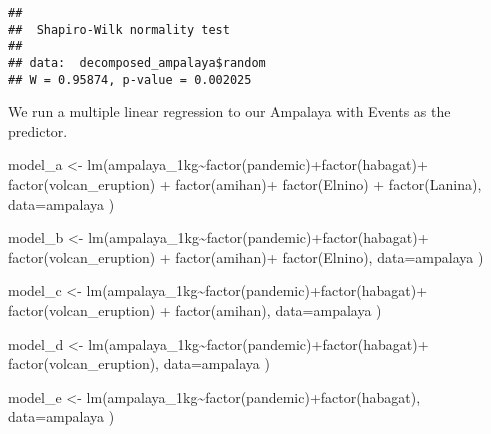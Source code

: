 \documentclass[
]{article}
\newenvironment{Shaded}{\begin{snugshade}}{\end{snugshade}}
\newcommand{\AttributeTok}[1]{\textcolor[rgb]{0.77,0.63,0.00}{#1}}
\newcommand{\FunctionTok}[1]{\textcolor[rgb]{0.00,0.00,0.00}{#1}}
\newcommand{\NormalTok}[1]{#1}
\newcommand{\OtherTok}[1]{\textcolor[rgb]{0.56,0.35,0.01}{#1}}
\newcommand{\SpecialCharTok}[1]{\textcolor[rgb]{0.00,0.00,0.00}{#1}}
\begin{document}
\begin{verbatim}
## 
##  Shapiro-Wilk normality test
## 
## data:  decomposed_ampalaya$random
## W = 0.95874, p-value = 0.002025
\end{verbatim}

We run a multiple linear regression to our Ampalaya with Events as the
predictor.

\begin{Shaded}
\begin{Highlighting}[]
\NormalTok{model\_a }\OtherTok{\textless{}{-}} \FunctionTok{lm}\NormalTok{(ampalaya\_1kg}\SpecialCharTok{\textasciitilde{}}\FunctionTok{factor}\NormalTok{(pandemic)}\SpecialCharTok{+}\FunctionTok{factor}\NormalTok{(habagat)}\SpecialCharTok{+}
                \FunctionTok{factor}\NormalTok{(volcan\_eruption) }\SpecialCharTok{+} \FunctionTok{factor}\NormalTok{(amihan)}\SpecialCharTok{+} \FunctionTok{factor}\NormalTok{(Elnino) }\SpecialCharTok{+} \FunctionTok{factor}\NormalTok{(Lanina), }
              \AttributeTok{data=}\NormalTok{ampalaya )}

\NormalTok{model\_b }\OtherTok{\textless{}{-}} \FunctionTok{lm}\NormalTok{(ampalaya\_1kg}\SpecialCharTok{\textasciitilde{}}\FunctionTok{factor}\NormalTok{(pandemic)}\SpecialCharTok{+}\FunctionTok{factor}\NormalTok{(habagat)}\SpecialCharTok{+}
                \FunctionTok{factor}\NormalTok{(volcan\_eruption) }\SpecialCharTok{+} \FunctionTok{factor}\NormalTok{(amihan)}\SpecialCharTok{+} \FunctionTok{factor}\NormalTok{(Elnino), }
              \AttributeTok{data=}\NormalTok{ampalaya )}

\NormalTok{model\_c }\OtherTok{\textless{}{-}} \FunctionTok{lm}\NormalTok{(ampalaya\_1kg}\SpecialCharTok{\textasciitilde{}}\FunctionTok{factor}\NormalTok{(pandemic)}\SpecialCharTok{+}\FunctionTok{factor}\NormalTok{(habagat)}\SpecialCharTok{+}
                \FunctionTok{factor}\NormalTok{(volcan\_eruption) }\SpecialCharTok{+} \FunctionTok{factor}\NormalTok{(amihan), }
              \AttributeTok{data=}\NormalTok{ampalaya )}

\NormalTok{model\_d }\OtherTok{\textless{}{-}} \FunctionTok{lm}\NormalTok{(ampalaya\_1kg}\SpecialCharTok{\textasciitilde{}}\FunctionTok{factor}\NormalTok{(pandemic)}\SpecialCharTok{+}\FunctionTok{factor}\NormalTok{(habagat)}\SpecialCharTok{+}
                \FunctionTok{factor}\NormalTok{(volcan\_eruption), }
              \AttributeTok{data=}\NormalTok{ampalaya )}

\NormalTok{model\_e }\OtherTok{\textless{}{-}} \FunctionTok{lm}\NormalTok{(ampalaya\_1kg}\SpecialCharTok{\textasciitilde{}}\FunctionTok{factor}\NormalTok{(pandemic)}\SpecialCharTok{+}\FunctionTok{factor}\NormalTok{(habagat), }
              \AttributeTok{data=}\NormalTok{ampalaya )}


\end{Highlighting}
\end{Shaded}
\end{document}

